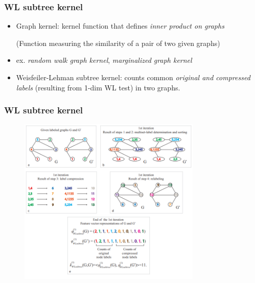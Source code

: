 \documentclass{beamer}
\begin{document}
\begin{frame}
\frametitle{WL subtree kernel}

\begin{itemize}
	\item \alert{Graph kernel}: kernel function that defines {\it inner product on graphs} 
	
(Function measuring the similarity of a pair of two given graphs) \pause

	\item ex. {\it random walk graph kernel}, {\it marginalized graph kernel} \pause
	
	\item \alert{Weisfeiler-Lehman subtree kernel}: counts common {\it original and compressed labels} (resulting from 1-dim WL test) in two graphs.
\end{itemize}

\end{frame}

\begin{frame}
\frametitle{WL subtree kernel}

\begin{figure}[hbt]
	\includegraphics[height=8cm]{fig1.png}
\end{figure}

\end{frame}
\end{document}
